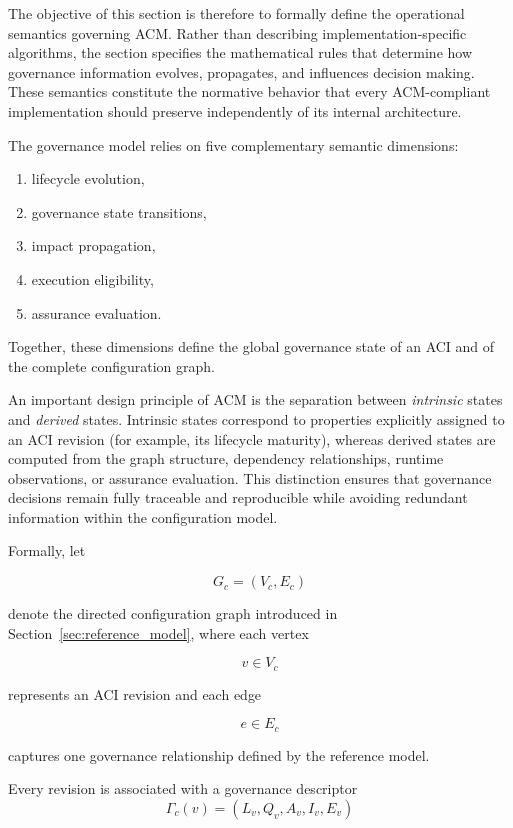 \documentclass[10pt]{article}
\begin{document}
The objective of this section is therefore to formally define the operational
semantics governing ACM. Rather than describing implementation-specific
algorithms, the section specifies the mathematical rules that determine how
governance information evolves, propagates, and influences decision making.
These semantics constitute the normative behavior that every ACM-compliant
implementation should preserve independently of its internal architecture.

The governance model relies on five complementary semantic dimensions:

\begin{enumerate}
    \item lifecycle evolution,
    \item governance state transitions,
    \item impact propagation,
    \item execution eligibility,
    \item assurance evaluation.
\end{enumerate}

Together, these dimensions define the global governance state of an ACI and of
the complete configuration graph.

An important design principle of ACM is the separation between
\emph{intrinsic} states and \emph{derived} states. Intrinsic states correspond
to properties explicitly assigned to an ACI revision (for example, its
lifecycle maturity), whereas derived states are computed from the graph
structure, dependency relationships, runtime observations, or assurance
evaluation. This distinction ensures that governance decisions remain fully
traceable and reproducible while avoiding redundant information within the
configuration model.

Formally, let

\[
G_c=(V_c,E_c)
\]

denote the directed configuration graph introduced in Section~\ref{sec:reference_model},
where each vertex

\[
v\in V_c
\]

represents an ACI revision and each edge

\[
e\in E_c
\]

captures one governance relationship defined by the reference model.

Every revision is associated with a governance descriptor
\begin{equation}
\Gamma_{c}(v)=
(
L_v,
Q_v,
A_v,
I_v,
E_v
)
\label{eq:acm_descriptor}
\end{equation}
\end{document}
